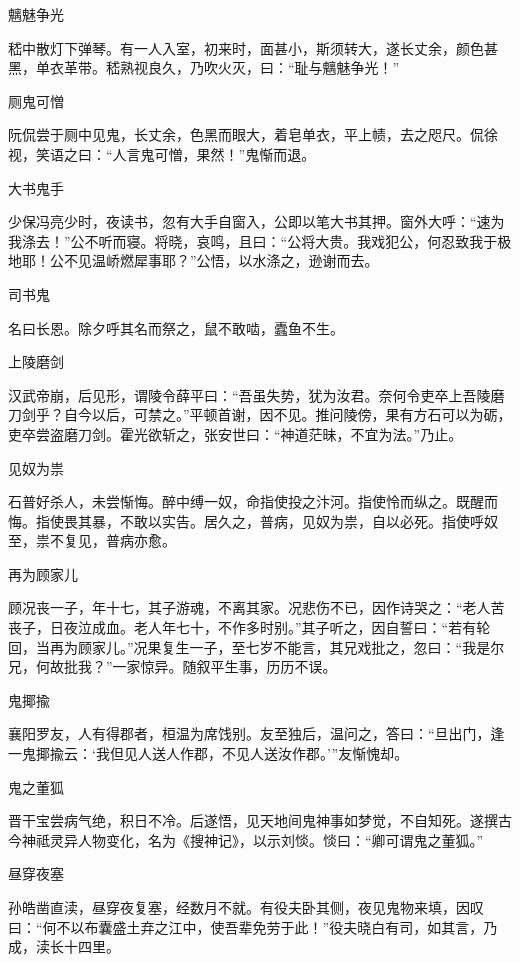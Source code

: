 \documentclass[a4paper,12pt,UTF8,twoside]{ctexbook}
\begin{document}
    魑魅争光
    
    嵇中散灯下弹琴。有一人入室，初来时，面甚小，斯须转大，遂长丈余，颜色甚黑，单衣革带。嵇熟视良久，乃吹火灭，曰：“耻与魑魅争光！”
    
    厕鬼可憎
    
    阮侃尝于厕中见鬼，长丈余，色黑而眼大，着皂单衣，平上帻，去之咫尺。侃徐视，笑语之曰：“人言鬼可憎，果然！”鬼惭而退。
    
    大书鬼手
    
    少保冯亮少时，夜读书，忽有大手自窗入，公即以笔大书其押。窗外大呼：“速为我涤去！”公不听而寝。将晓，哀鸣，且曰：“公将大贵。我戏犯公，何忍致我于极地耶！公不见温峤燃犀事耶？”公悟，以水涤之，逊谢而去。
    
    司书鬼
    
    名曰长恩。除夕呼其名而祭之，鼠不敢啮，蠹鱼不生。
    
    上陵磨剑
    
    汉武帝崩，后见形，谓陵令薛平曰：“吾虽失势，犹为汝君。奈何令吏卒上吾陵磨刀剑乎？自今以后，可禁之。”平顿首谢，因不见。推问陵傍，果有方石可以为砺，吏卒尝盗磨刀剑。霍光欲斩之，张安世曰：“神道茫昧，不宜为法。”乃止。
    
    见奴为祟
    
    石普好杀人，未尝惭悔。醉中缚一奴，命指使投之汴河。指使怜而纵之。既醒而悔。指使畏其暴，不敢以实告。居久之，普病，见奴为祟，自以必死。指使呼奴至，祟不复见，普病亦愈。
    
    再为顾家儿
    
    顾况丧一子，年十七，其子游魂，不离其家。况悲伤不已，因作诗哭之：“老人苦丧子，日夜泣成血。老人年七十，不作多时别。”其子听之，因自誓曰：“若有轮回，当再为顾家儿。”况果复生一子，至七岁不能言，其兄戏批之，忽曰：“我是尔兄，何故批我？”一家惊异。随叙平生事，历历不误。
    
    鬼揶揄
    
    襄阳罗友，人有得郡者，桓温为席饯别。友至独后，温问之，答曰：“旦出门，逢一鬼揶揄云：‘我但见人送人作郡，不见人送汝作郡。’”友惭愧却。
    
    鬼之董狐
    
    晋干宝尝病气绝，积日不冷。后遂悟，见天地间鬼神事如梦觉，不自知死。遂撰古今神祗灵异人物变化，名为《搜神记》，以示刘惔。惔曰：“卿可谓鬼之董狐。”
    
    昼穿夜塞
    
    孙皓凿直渎，昼穿夜复塞，经数月不就。有役夫卧其侧，夜见鬼物来填，因叹曰：“何不以布囊盛土弃之江中，使吾辈免劳于此！”役夫晓白有司，如其言，乃成，渎长十四里。
    
\end{document}

